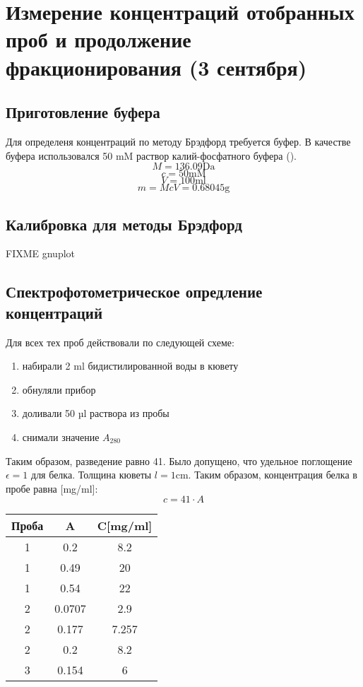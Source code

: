 \section{Измерение концентраций отобранных проб и продолжение фракционирования (3 сентября)}
\subsection{Приготовление буфера}
Для определеня концентраций по методу Брэдфорд требуется буфер.
В качестве буфера использовался 50 mM раствор калий-фосфатного буфера ().
$$ M = 136.09 \text{Da} $$
$$ c = 50 \text{mM} $$
$$ V = 100 \text{ml} $$
$$ m = McV = 0.68045 \text{g} $$

\subsection{Калибровка для методы Брэдфорд}

FIXME gnuplot

\subsection{Спектрофотометрическое опредление концентраций}
Для всех тех проб действовали по следующей схеме:
\begin{enumerate}
\item набирали 2 ml бидистилированной воды в кювету
\item обнуляли прибор
\item доливали 50 µl раствора из пробы
\item снимали значение $A_{280}$
\end{enumerate}
Таким образом, разведение равно 41.
Было допущено, что удельное поглощение $\epsilon = 1$ для белка.
Толщина кюветы $l = 1 \text{cm}$.
Таким образом, концентрация белка в пробе равна [mg/ml]:
$$ c=41 \cdot A $$

\begin{tabular}{|c|c|c|}
\hline
Проба & A & C[mg/ml] \\
\hline
1 & 0.2 & 8.2 \\
1 & 0.49 & 20 \\
1 & 0.54 & 22 \\
\hline
2 & 0.0707 & 2.9 \\
2 & 0.177 & 7.257 \\
2 & 0.2 & 8.2 \\
\hline
3 & 0.154 & 6 \\
\hline
\end{tabular}

